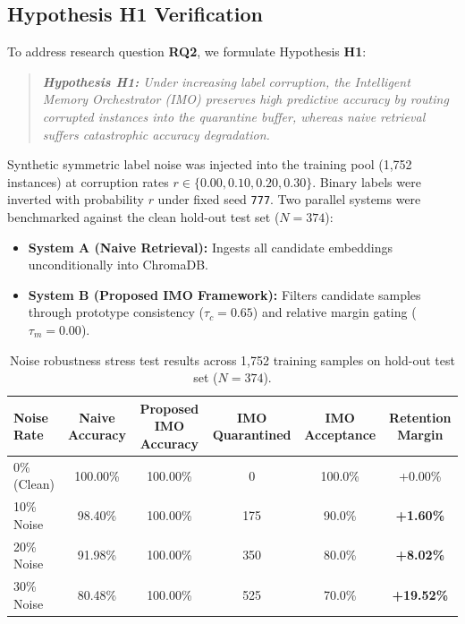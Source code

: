\documentclass[sn-mathphys,Numbered]{sn-jnl}
\begin{document}
\subsection{Hypothesis H1 Verification}
To address research question \textbf{RQ2}, we formulate Hypothesis \textbf{H1}:
\begin{quote}
\textit{\textbf{Hypothesis H1:} Under increasing label corruption, the Intelligent Memory Orchestrator (IMO) preserves high predictive accuracy by routing corrupted instances into the quarantine buffer, whereas naive retrieval suffers catastrophic accuracy degradation.}
\end{quote}

Synthetic symmetric label noise was injected into the training pool (1,752 instances) at corruption rates $r \in \{0.00, 0.10, 0.20, 0.30\}$. Binary labels were inverted with probability $r$ under fixed seed \texttt{777}. Two parallel systems were benchmarked against the clean hold-out test set ($N=374$):
\begin{itemize}
    \item \textbf{System A (Naive Retrieval):} Ingests all candidate embeddings unconditionally into ChromaDB.
    \item \textbf{System B (Proposed IMO Framework):} Filters candidate samples through prototype consistency ($\tau_c = 0.65$) and relative margin gating ($\tau_m = 0.00$).
\end{itemize}

\begin{table}[h]
\caption{Noise robustness stress test results across 1,752 training samples on hold-out test set ($N=374$).}
\label{tab:noise_results}
\centering
\begin{tabular*}{\textwidth}{@{\extracolsep{\fill}}lccccc@{\extracolsep{\fill}}}
\toprule
Noise Rate & Naive Accuracy & Proposed IMO Accuracy & IMO Quarantined & IMO Acceptance & Retention Margin \\
\midrule
0\% (Clean) & 100.00\% & 100.00\% & 0 & 100.0\% & +0.00\% \\
10\% Noise & 98.40\% & 100.00\% & 175 & 90.0\% & \textbf{+1.60\%} \\
20\% Noise & 91.98\% & 100.00\% & 350 & 80.0\% & \textbf{+8.02\%} \\
30\% Noise & 80.48\% & 100.00\% & 525 & 70.0\% & \textbf{+19.52\%} \\
\bottomrule
\end{tabular*}
\end{table}
\end{document}
